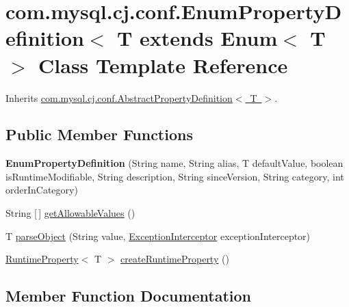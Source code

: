 \hypertarget{classcom_1_1mysql_1_1cj_1_1conf_1_1_enum_property_definition}{}\section{com.\+mysql.\+cj.\+conf.\+Enum\+Property\+Definition$<$ T extends Enum$<$ T $>$ Class Template Reference}
\label{classcom_1_1mysql_1_1cj_1_1conf_1_1_enum_property_definition}


Inherits \mbox{\hyperlink{classcom_1_1mysql_1_1cj_1_1conf_1_1_abstract_property_definition}{com.\+mysql.\+cj.\+conf.\+Abstract\+Property\+Definition$<$ T $>$}}.

\subsection*{Public Member Functions}
\begin{DoxyCompactItemize}
\item 
\mbox{\label{classcom_1_1mysql_1_1cj_1_1conf_1_1_enum_property_definition_a9e287073983d3b7f018138692ac1960d}} 
{\bfseries Enum\+Property\+Definition} (String name, String alias, T default\+Value, boolean is\+Runtime\+Modifiable, String description, String since\+Version, String category, int order\+In\+Category)
\item 
String \mbox{[}$\,$\mbox{]} \mbox{\hyperlink{classcom_1_1mysql_1_1cj_1_1conf_1_1_enum_property_definition_a7e2ff8f6f7baf418abdae017a6bd8136}{get\+Allowable\+Values}} ()
\item 
T \mbox{\hyperlink{classcom_1_1mysql_1_1cj_1_1conf_1_1_enum_property_definition_a00a259a5d83a0a7c6522309ff44146ba}{parse\+Object}} (String value, \mbox{\hyperlink{interfacecom_1_1mysql_1_1cj_1_1exceptions_1_1_exception_interceptor}{Exception\+Interceptor}} exception\+Interceptor)
\item 
\mbox{\hyperlink{interfacecom_1_1mysql_1_1cj_1_1conf_1_1_runtime_property}{Runtime\+Property}}$<$ T $>$ \mbox{\hyperlink{classcom_1_1mysql_1_1cj_1_1conf_1_1_enum_property_definition_a463e1e063d6969ca3d352b31ea9324b5}{create\+Runtime\+Property}} ()
\end{DoxyCompactItemize}


\subsection{Member Function Documentation}
\mbox{\label{classcom_1_1mysql_1_1cj_1_1conf_1_1_enum_property_definition_a463e1e063d6969ca3d352b31ea9324b5}} 
